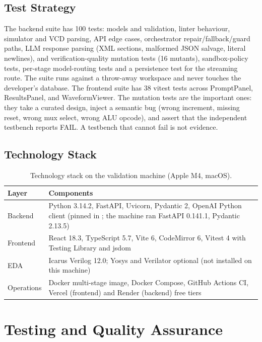 \documentclass[11pt,a4paper]{article}
\newcommand{\code}[1]{\texttt{\detokenize{#1}}}
\begin{document}
\subsection{Test Strategy}
The backend suite has 100 tests: models and validation, linter behaviour, simulator
and VCD parsing, API edge cases, orchestrator repair/fallback/guard paths, LLM
response parsing (XML sections, malformed JSON salvage, literal newlines), and
verification-quality mutation tests (16 mutants), sandbox-policy tests, per-stage model-routing tests and a persistence test for the streaming route. The suite runs against a throw-away workspace and never touches the developer's database. The frontend suite has 38 vitest tests across
PromptPanel, ResultsPanel, and WaveformViewer. The mutation tests are the important
ones: they take a curated design, inject a semantic bug (wrong increment, missing
reset, wrong mux select, wrong ALU opcode), and assert that the independent
testbench reports FAIL. A testbench that cannot fail is not evidence.

\subsection{Technology Stack}
\begin{table}[H]
\centering
\caption{Technology stack on the validation machine (Apple M4, macOS).}
\label{tab:stack}
\footnotesize
\begin{tabularx}{\textwidth}{@{}p{2.4cm}X@{}}
\toprule
\textbf{Layer} & \textbf{Components} \\
\midrule
Backend & Python 3.14.2, FastAPI, Uvicorn, Pydantic 2, OpenAI Python client (pinned in \code{requirements.txt}; the machine ran FastAPI 0.141.1, Pydantic 2.13.5) \\
Frontend & React 18.3, TypeScript 5.7, Vite 6, CodeMirror 6, Vitest 4 with Testing Library and jsdom \\
EDA & Icarus Verilog 12.0; Yosys and Verilator optional (not installed on this machine) \\
Operations & Docker multi-stage image, Docker Compose, GitHub Actions CI, Vercel (frontend) and Render (backend) free tiers \\
\bottomrule
\end{tabularx}
\end{table}

\section{Testing and Quality Assurance}
\label{sec:testing}
\end{document}
